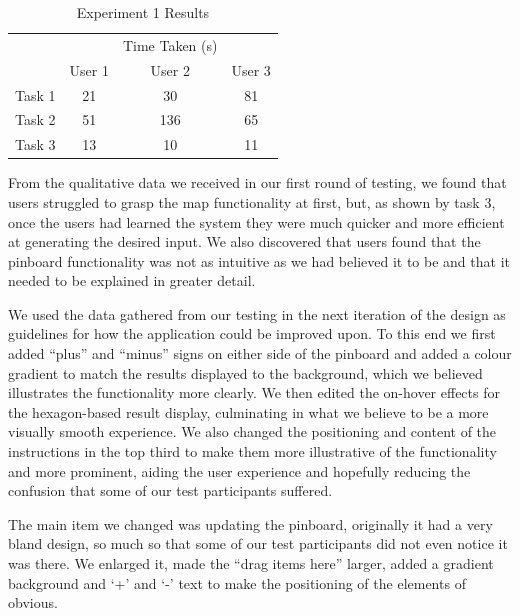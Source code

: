 \documentclass[10pt,a4paper]{article}
\begin{document}
\begin{table}[H]
\centering
\begin{tabular}{c|ccc|}
\cline{2-4}
                             &                             & Time Taken (s)                &        \\ \cline{2-4} 
                             & \multicolumn{1}{c|}{User 1} & \multicolumn{1}{c|}{User 2} & User 3 \\ \hline
\multicolumn{1}{|c|}{Task 1} & \multicolumn{1}{c|}{21}       & \multicolumn{1}{c|}{30}       &     81  \\ \hline
\multicolumn{1}{|c|}{Task 2} & \multicolumn{1}{c|}{51}       & \multicolumn{1}{c|}{136}       &     65   \\ \hline
\multicolumn{1}{|c|}{Task 3} & \multicolumn{1}{c|}{13}       & \multicolumn{1}{c|}{10}       &    11   \\ \hline
\end{tabular}
\caption{Experiment 1 Results \label{table:experiment-1}}
\end{table}

From the qualitative data we received in our first round of testing, we found that users struggled to grasp the map functionality at first, but, as shown by task 3, once the users had learned the system they were much quicker and more efficient at generating the desired input. We also discovered that users found that the pinboard functionality was not as intuitive as we had believed it to be and that it needed to be explained in greater detail.

We used the data gathered from our testing in the next iteration of the design as guidelines for how the application could be improved upon. To this end we first added “plus” and “minus” signs on either side of the pinboard and added a colour gradient to match the results displayed to the background, which we believed illustrates the functionality more clearly. We then edited the on-hover effects for the hexagon-based result display, culminating in what we believe to be a more visually smooth experience. We also changed the positioning and content of the instructions in the top third to make them more illustrative of the functionality and more prominent, aiding the user experience and hopefully reducing the confusion that some of our test participants suffered.

The main item we changed was updating the pinboard, originally it had a very bland design, so much so that some of our test participants did not even notice it was there. We enlarged it, made the “drag items here” larger, added a gradient background and ‘+’ and ‘-’ text to make the positioning of the elements of obvious. 
\end{document}
